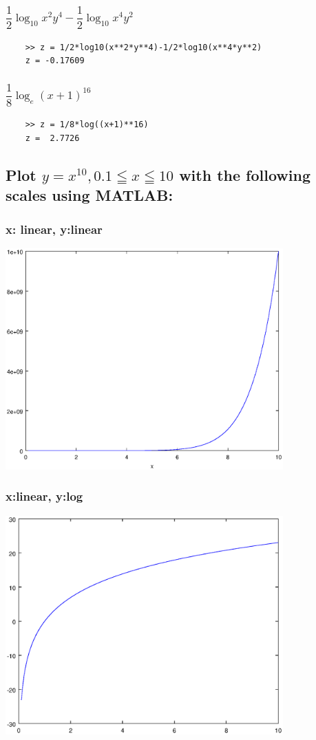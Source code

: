 \documentclass[12pt,a4paper]{article}
\begin{document}
\subsubsection{$\dfrac{1}{2}\log_{10}x^2y^4-\dfrac{1}{2}\log_{10}x^4y^2$}
\begin{lstlisting}
	>> z = 1/2*log10(x**2*y**4)-1/2*log10(x**4*y**2)
	z = -0.17609
\end{lstlisting}
\subsubsection{$\dfrac{1}{8}\log_e(x+1)^{16}$}
\begin{lstlisting}
	>> z = 1/8*log((x+1)**16)
	z =  2.7726
\end{lstlisting}
\subsection{Plot $y=x^{10}, 0.1\leqq x\leqq 10$ with the following scales using MATLAB:}          

\subsubsection{x: linear, y:linear} 
\includegraphics[width=0.8\textwidth]{1.eps}
\subsubsection{x:linear, y:log} 
\includegraphics[width=0.8\textwidth]{2.eps}
\end{document}
